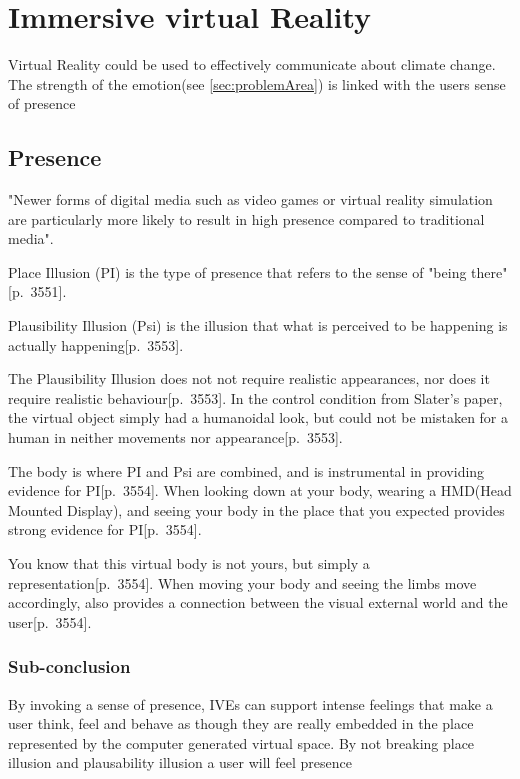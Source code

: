 \section{Immersive virtual Reality}
    Virtual Reality could be used to effectively communicate about climate change. 
    The strength of the emotion(see \autoref{sec:problemArea}) is linked with the users sense of presence\cite{vrEngagementClimateChange}
    
    \subsection{Presence}
    "Newer forms of digital media such as video games or virtual reality simulation are particularly more likely to result in high presence compared to traditional media"\cite{ahn2011embodied}.
    
    Place Illusion (PI) is the type of presence that refers to the sense of "being there"\citep{vrImmersion}[p.~3551].
    
    Plausibility Illusion (Psi) is the illusion that what is perceived to be happening is actually happening\citep{vrImmersion}[p.~3553].
    
    The Plausibility Illusion does not not require realistic appearances, nor does it require realistic behaviour\citep{vrImmersion}[p.~3553]. In the control condition from Slater's paper, the virtual object simply had a humanoidal look, but could not be mistaken for a human in neither movements nor appearance\citep{vrImmersion}[p.~3553].
    
    The body is where PI and Psi are combined, and is instrumental in providing evidence for PI\citep{vrImmersion}[p.~3554]. When looking down at your body, wearing a HMD(Head Mounted Display), and seeing your body in the place that you expected provides strong evidence for PI\citep{vrImmersion}[p.~3554].
    
    You know that this virtual body is not yours, but simply a representation\citep{vrImmersion}[p.~3554]. When moving your body and seeing the limbs move accordingly, also provides a connection between the visual external world and the user\citep{vrImmersion}[p.~3554].
    
    \subsubsection{Sub-conclusion}
    By invoking a sense of presence, IVEs can support intense feelings that make a user think, feel and behave as though they are really embedded in the place represented by the computer generated virtual space.
    By not breaking place illusion and plausability illusion a user will feel presence

